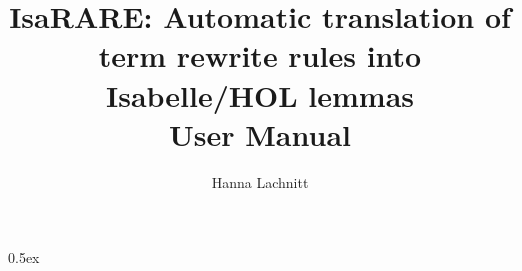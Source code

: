 \documentclass[11pt,a4paper]{article}
\begin{document}
\title{IsaRARE: Automatic translation of term rewrite rules into Isabelle/HOL lemmas\\[1em] User Manual}

\author{Hanna Lachnitt}
\maketitle

\tableofcontents

\parindent 0pt\parskip 0.5ex





\end{document}
